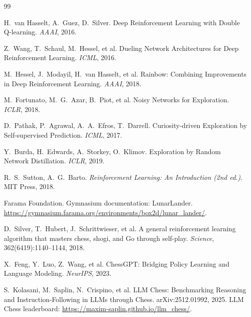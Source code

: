 \documentclass[11pt,a4paper]{article}
\begin{document}
\newpage
\begin{thebibliography}{99}\small

H.\ van Hasselt, A.\ Guez, D.\ Silver.
\newblock Deep Reinforcement Learning with Double Q-learning.
\newblock \emph{AAAI}, 2016.

Z.\ Wang, T.\ Schaul, M.\ Hessel, et al.
\newblock Dueling Network Architectures for Deep Reinforcement Learning.
\newblock \emph{ICML}, 2016.

M.\ Hessel, J.\ Modayil, H.\ van Hasselt, et al.
\newblock Rainbow: Combining Improvements in Deep Reinforcement Learning.
\newblock \emph{AAAI}, 2018.

M.\ Fortunato, M.\ G.\ Azar, B.\ Piot, et al.
\newblock Noisy Networks for Exploration.
\newblock \emph{ICLR}, 2018.

D.\ Pathak, P.\ Agrawal, A.\ A.\ Efros, T.\ Darrell.
\newblock Curiosity-driven Exploration by Self-supervised Prediction.
\newblock \emph{ICML}, 2017.

Y.\ Burda, H.\ Edwards, A.\ Storkey, O.\ Klimov.
\newblock Exploration by Random Network Distillation.
\newblock \emph{ICLR}, 2019.

R.\ S.\ Sutton, A.\ G.\ Barto.
\newblock \emph{Reinforcement Learning: An Introduction (2nd ed.)}.
\newblock MIT Press, 2018.

Farama Foundation.
\newblock Gymnasium documentation: LunarLander.
\newblock \url{https://gymnasium.farama.org/environments/box2d/lunar_lander/}.

D.\ Silver, T.\ Hubert, J.\ Schrittwieser, et al.
\newblock A general reinforcement learning algorithm that masters chess,
shogi, and Go through self-play.
\newblock \emph{Science}, 362(6419):1140--1144, 2018.

X.\ Feng, Y.\ Luo, Z.\ Wang, et al.
\newblock ChessGPT: Bridging Policy Learning and Language Modeling.
\newblock \emph{NeurIPS}, 2023.

S.\ Kolasani, M.\ Saplin, N.\ Crispino, et al.
\newblock LLM Chess: Benchmarking Reasoning and Instruction-Following
in LLMs through Chess.
\newblock arXiv:2512.01992, 2025.
\newblock LLM Chess leaderboard: \url{https://maxim-saplin.github.io/llm_chess/}.


\end{thebibliography}
\end{document}
